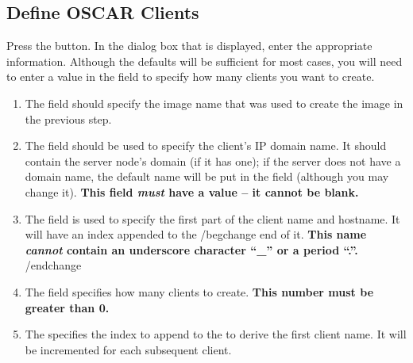 
\subsection{Define OSCAR Clients}
\label{det:define-clients}

Press the  button.  In the dialog box
that is displayed, enter the appropriate information.  Although the
defaults will be sufficient for most cases, you will need to enter a
value in the  field to specify how many clients
you want to create.

\begin{enumerate}

\item The  field should specify the image name that
  was used to create the image in the previous step.

\item The  field should be used to specify the
  client's IP domain name.
%
  It should contain the server node's domain (if it has one); if the
  server does not have a domain name, the default name
   will be put in the field (although you may
  change it).
%
  {\bf This field \emph{must} have a value -- it cannot be blank.}
%

\item The  field is used to specify the first part of
  the client name and hostname. It will have an index appended to the
/begchange
  end of it. {\bf This name \emph{cannot} contain an underscore
  character ``\_'' or a period ``.''.}
/endchange

\item The  field specifies how many clients to
  create.  {\bf This number must be greater than 0.}

\item The  specifies the index to append to the
   to derive the first client name. It will be
  incremented for each subsequent client.


\end{enumerate}
